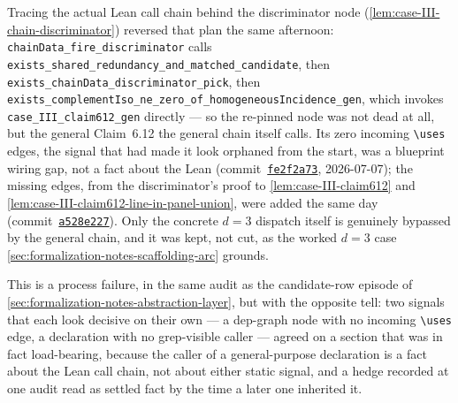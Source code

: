 Tracing the actual Lean call chain behind the discriminator node
(\cref{lem:case-III-chain-discriminator}) reversed that plan the same
afternoon: \texttt{chainData\_fire\_discriminator} calls
\texttt{exists\_\allowbreak{}shared\_\allowbreak{}redundancy\_\allowbreak{}and\_\allowbreak{}matched\_\allowbreak{}candidate},
then \texttt{exists\_chainData\_discriminator\_pick}, then
\texttt{exists\_\allowbreak{}complementIso\_\allowbreak{}ne\_\allowbreak{}zero\_\allowbreak{}of\_\allowbreak{}homogeneousIncidence\_\allowbreak{}gen},
which invokes \texttt{case\_III\_claim612\_gen} directly --- so the
re-pinned node was not dead at all, but the general Claim~6.12 the general
chain itself calls. Its zero incoming \texttt{\textbackslash uses} edges,
the signal that had made it look orphaned from the start, was a blueprint
wiring gap, not a fact about the Lean
(commit~\href{https://github.com/bryangingechen/CombinatorialRigidity/commit/fe2f2a73c04e8bd0f557d1b30d0f704c31d54967}{\texttt{fe2f2a73}},
2026-07-07); the missing edges, from the discriminator's proof to
\cref{lem:case-III-claim612} and
\cref{lem:case-III-claim612-line-in-panel-union}, were added the same day
(commit~\href{https://github.com/bryangingechen/CombinatorialRigidity/commit/a528e227ed179014f68651e8a8196fce27ec9046}{\texttt{a528e227}}).
Only the concrete $d = 3$ dispatch itself is genuinely bypassed by the
general chain, and it was kept, not cut, as the worked $d = 3$ case
\cref{sec:formalization-notes-scaffolding-arc} grounds.

This is a process failure, in the same audit as the candidate-row episode
of \cref{sec:formalization-notes-abstraction-layer}, but with the opposite
tell: two signals that each look decisive on their own --- a dep-graph
node with no incoming \texttt{\textbackslash uses} edge, a declaration
with no grep-visible caller --- agreed on a section that was in fact
load-bearing, because the caller of a general-purpose declaration is a
fact about the Lean call chain, not about either static signal, and a
hedge recorded at one audit read as settled fact by the time a later one
inherited it.

